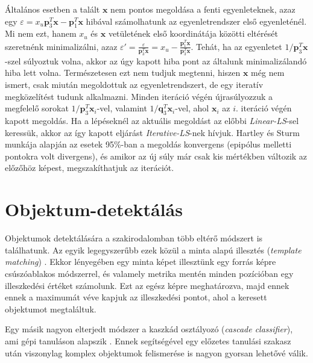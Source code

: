Általános esetben a talált $\mathbf{x}$ nem pontos megoldása a fenti egyenleteknek, azaz egy $\varepsilon = x_u\mathbf{p}_3^T\mathbf{x} - \mathbf{p}_1^T\mathbf{x}$ hibával számolhatunk az egyenletrendszer első egyenleténél. Mi nem ezt, hanem $x_u$ és $\mathbf{x}$ vetületének első koordinátája közötti eltérését szeretnénk minimalizálni, azaz $\varepsilon' = \frac{\varepsilon}{\mathbf{p}_3^T\mathbf{x}} = x_u - \frac{\mathbf{p}_1^T\mathbf{x}}{\mathbf{p}_3^T\mathbf{x}}$. Tehát, ha az egyenletet $1 / \mathbf{p}_3^T\mathbf{x}$-szel súlyoztuk volna, akkor az úgy kapott hiba pont az általunk minimalizálandó hiba lett volna. Természetesen ezt nem tudjuk megtenni, hiszen $\mathbf{x}$ még nem ismert, csak miután megoldottuk az egyenletrendszert, de egy iteratív megközelítést tudunk alkalmazni. Minden iteráció végén újrasúlyozzuk a megfelelő sorokat $1 / \mathbf{p}_3^T\mathbf{x}_i$-vel, valamint $1 / \mathbf{q}_3^T\mathbf{x}_i$-vel, ahol $\mathbf{x}_i$ az $i$. iteráció végén kapott megoldás. Ha a lépéseknél az aktuális megoldást az előbbi \textit{Linear-LS}-sel keressük, akkor az így kapott eljárást \textit{Iterative-LS}-nek hívjuk. Hartley és Sturm \cite[5.2 szekció]{hartley-triangulation} munkája alapján az esetek 95\%-ban a megoldás konvergens (epipólus melletti pontokra volt divergens), és amikor az új súly már csak kis mértékben változik az előzőhöz képest, megszakíthatjuk az iterációt.

\section{Objektum-detektálás \label{sec:obj_detection}}

Objektumok detektálására a szakirodalomban több eltérő módszert is találhatunk. Az egyik legegyszerűbb ezek közül a minta alapú illesztés (\textit{template matching}) \cite{brunelli1997template}. Ekkor lényegében egy minta képet illesztünk egy forrás képre csúszóablakos módszerrel, és valamely metrika mentén minden pozícióban egy illeszkedési értéket számolunk. Ezt az egész képre meghatározva, majd ennek ennek a maximumát véve kapjuk az illeszkedési pontot, ahol a keresett objektumot megtaláltuk.

Egy másik nagyon elterjedt módszer a kaszkád osztályozó (\textit{cascade classifier}), ami gépi tanuláson alapszik \cite{viola2001rapid}. Ennek segítségével egy előzetes tanulási szakasz után viszonylag komplex objektumok felismerése is nagyon gyorsan lehetővé válik.

